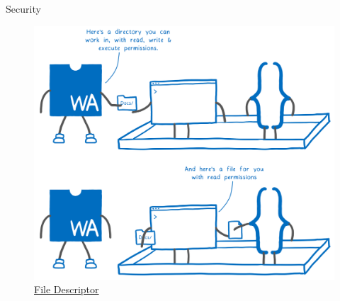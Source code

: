 \documentclass{beamer}
\begin{document}
\begin{frame}{Security}
    \begin{figure}
        \includegraphics[scale=0.06]{./images/file.png}
        \caption{\href{https://hacks.mozilla.org/2019/03/standardizing-wasi-a-webassembly-system-interface/}{File Descriptor}}
    \end{figure}
\end{frame}
\end{document}
